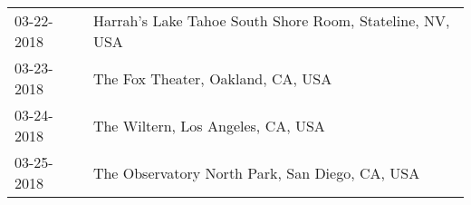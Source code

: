 \begin{supertabular}{ll}
 03-22-2018 &  Harrah’s Lake Tahoe South Shore Room, Stateline, NV, USA \\
 03-23-2018 &                         The Fox Theater, Oakland, CA, USA \\
 03-24-2018 &                         The Wiltern, Los Angeles, CA, USA \\
 03-25-2018 &            The Observatory North Park, San Diego, CA, USA \\
\end{supertabular}

